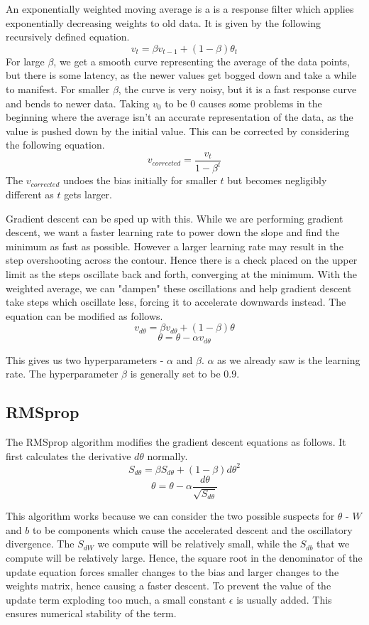 \documentclass{article}
\begin{document}
An exponentially weighted moving average is a is a response filter which applies exponentially decreasing weights to old data. It is given by the following recursively defined equation.
$$v_t = \beta v_{t-1} + (1-\beta)\theta_t$$
For large $\beta$, we get a smooth curve representing the average of the data points, but there is some latency, as the newer values get bogged down and take a while to manifest. For smaller $\beta$, the curve is very noisy, but it is a fast response curve and bends to newer data. Taking $v_0$ to be 0 causes some problems in the beginning where the average isn't an accurate representation of the data, as the value is pushed down by the initial value. This can be corrected by considering the following equation. 
$$v_{corrected} = \frac{v_t}{1-\beta^t}$$
The $v_{corrected}$ undoes the bias initially for smaller $t$ but becomes negligibly different as $t$ gets larger.

Gradient descent can be sped up with this. While we are performing gradient descent, we want a faster learning rate to power down the slope and find the minimum as fast as possible. However a larger learning rate may result in the step overshooting across the contour. Hence there is a check placed on the upper limit as the steps oscillate back and forth, converging at the minimum. With the weighted average, we can "dampen" these oscillations and help gradient descent take steps which oscillate less, forcing it to accelerate downwards instead. The equation can be modified as follows.
$$v_{d \theta} = \beta v_{d \theta} + (1-\beta)\theta$$
$$\theta = \theta - \alpha v_{d \theta}$$

This gives us two hyperparameters - $\alpha$ and $\beta$. $\alpha$ as we already saw is the learning rate. The hyperparameter $\beta$ is generally set to be $0.9$.

\subsection{RMSprop}

The RMSprop algorithm modifies the gradient descent equations as follows. It first calculates the derivative $d \theta$ normally. 
$$S_{d \theta} = \beta S_{d \theta} + (1-\beta) {d \theta}^2$$
$$\theta = \theta - \alpha \frac{d \theta}{\sqrt{S_{d \theta}}}$$

This algorithm works because we can consider the two possible suspects for $\theta$ - $W$ and $b$ to be components which cause the accelerated descent and the oscillatory divergence. The $S_{dW}$ we compute will be relatively small, while the $S_{db}$ that we compute will be relatively large. Hence, the square root in the denominator of the update equation forces smaller changes to the bias and larger changes to the weights matrix, hence causing a faster descent. To prevent the value of the update term exploding too much, a small constant $\epsilon$ is usually added. This ensures numerical stability of the term. 
\end{document}
